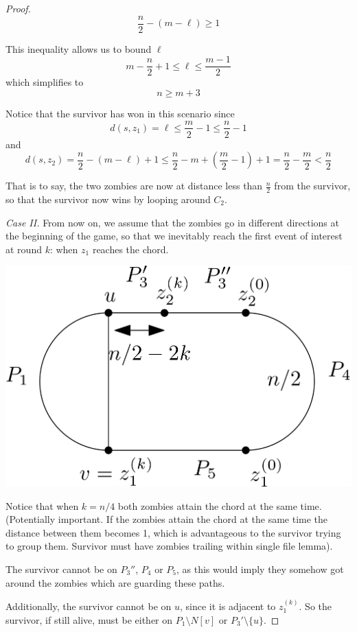 \documentclass[letterpaper, 10pt]{article}
\begin{document}
\begin{proof}
\[ \frac{n}{2} - (m-\ell) \geq 1 \]

This inequality allows us to bound $\ell$
\[ m - \frac{n}{2} +1 \leq \ell \leq \frac{m-1}{2}\]
which simplifies to
\[ n \geq m+3 \]

Notice that the survivor has won in this scenario since
\[ d(s,z_1) = \ell \leq \frac{m}{2} -1 \leq \frac{n}{2} -1 \]
and
\[ d(s,z_2) = \frac{n}{2} - (m - \ell) + 1 \leq \frac{n}{2} - m + \left(\frac{m}{2} -1\right) +1 = \frac{n}{2} - \frac{m}{2} < \frac{n}{2} \]

That is to say, the two zombies are now at distance less than $\frac{n}{2}$ from the survivor,
so that the survivor now wins by looping around $C_2$.

\emph{Case II.} From now on, we assume that the zombies go in different directions at the
beginning of the game, so that we inevitably reach the first event of interest at round $k$:
when $z_1$ reaches the chord.

\begin{center}
\includegraphics[scale=0.15]{diagram4}
\end{center}

Notice that when $k = n/4$ both zombies attain the chord at the same time. (Potentially important.
If the zombies attain the chord at the same time the distance between them becomes 1,
which is advantageous to the survivor trying to group them. Survivor must have zombies trailing within
single file lemma).

The survivor cannot be on $P_3''$, $P_4$ or $P_5$, as this would imply they
somehow got around the zombies which are guarding these paths.

Additionally, the survivor cannot be on $u$, since it is adjacent to $z_1^{(k)}$.
So the survivor, if still alive, must be either on $P_1 \setminus N[v]$ or $P_3' \setminus \{ u \} $.


\end{proof}
\end{document}

